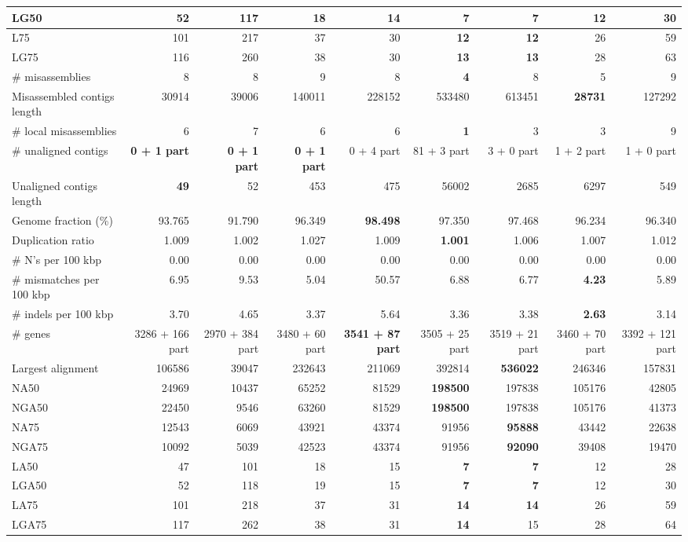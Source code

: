 \documentclass[12pt,a4paper]{article}
\begin{document}
\begin{table}[ht]
\begin{center}
\begin{tabular}{|l*{8}{|r}|}
LG50 & 52 & 117 & 18 & 14 & {\bf 7} & {\bf 7} & 12 & 30 \\ \hline
L75 & 101 & 217 & 37 & 30 & {\bf 12} & {\bf 12} & 26 & 59 \\ \hline
LG75 & 116 & 260 & 38 & 30 & {\bf 13} & {\bf 13} & 28 & 63 \\ \hline
\# misassemblies & 8 & 8 & 9 & 8 & {\bf 4} & 8 & 5 & 9 \\ \hline
Misassembled contigs length & 30914 & 39006 & 140011 & 228152 & 533480 & 613451 & {\bf 28731} & 127292 \\ \hline
\# local misassemblies & 6 & 7 & 6 & 6 & {\bf 1} & 3 & 3 & 9 \\ \hline
\# unaligned contigs & {\bf 0 + 1 part} & {\bf 0 + 1 part} & {\bf 0 + 1 part} & 0 + 4 part & 81 + 3 part & 3 + 0 part & 1 + 2 part & 1 + 0 part \\ \hline
Unaligned contigs length & {\bf 49} & 52 & 453 & 475 & 56002 & 2685 & 6297 & 549 \\ \hline
Genome fraction (\%) & 93.765 & 91.790 & 96.349 & {\bf 98.498} & 97.350 & 97.468 & 96.234 & 96.340 \\ \hline
Duplication ratio & 1.009 & 1.002 & 1.027 & 1.009 & {\bf 1.001} & 1.006 & 1.007 & 1.012 \\ \hline
\# N's per 100 kbp & 0.00 & 0.00 & 0.00 & 0.00 & 0.00 & 0.00 & 0.00 & 0.00 \\ \hline
\# mismatches per 100 kbp & 6.95 & 9.53 & 5.04 & 50.57 & 6.88 & 6.77 & {\bf 4.23} & 5.89 \\ \hline
\# indels per 100 kbp & 3.70 & 4.65 & 3.37 & 5.64 & 3.36 & 3.38 & {\bf 2.63} & 3.14 \\ \hline
\# genes & 3286 + 166 part & 2970 + 384 part & 3480 + 60 part & {\bf 3541 + 87 part} & 3505 + 25 part & 3519 + 21 part & 3460 + 70 part & 3392 + 121 part \\ \hline
Largest alignment & 106586 & 39047 & 232643 & 211069 & 392814 & {\bf 536022} & 246346 & 157831 \\ \hline
NA50 & 24969 & 10437 & 65252 & 81529 & {\bf 198500} & 197838 & 105176 & 42805 \\ \hline
NGA50 & 22450 & 9546 & 63260 & 81529 & {\bf 198500} & 197838 & 105176 & 41373 \\ \hline
NA75 & 12543 & 6069 & 43921 & 43374 & 91956 & {\bf 95888} & 43442 & 22638 \\ \hline
NGA75 & 10092 & 5039 & 42523 & 43374 & 91956 & {\bf 92090} & 39408 & 19470 \\ \hline
LA50 & 47 & 101 & 18 & 15 & {\bf 7} & {\bf 7} & 12 & 28 \\ \hline
LGA50 & 52 & 118 & 19 & 15 & {\bf 7} & {\bf 7} & 12 & 30 \\ \hline
LA75 & 101 & 218 & 37 & 31 & {\bf 14} & {\bf 14} & 26 & 59 \\ \hline
LGA75 & 117 & 262 & 38 & 31 & {\bf 14} & 15 & 28 & 64 \\ \hline
\end{tabular}
\end{center}
\end{table}
\end{document}
